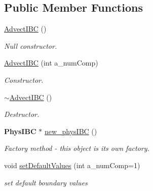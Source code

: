 \subsection*{Public Member Functions}
\begin{DoxyCompactItemize}
\item 
\mbox{\label{class_advect_i_b_c_af2d3f4fff7f08be3e1e3f140034bc34c}} 
\hyperlink{class_advect_i_b_c_af2d3f4fff7f08be3e1e3f140034bc34c}{Advect\+I\+BC} ()
\begin{DoxyCompactList}\small\item\em Null constructor. \end{DoxyCompactList}\item 
\mbox{\label{class_advect_i_b_c_a8897e6ad80cdff2121c4d4f6ce922ce1}} 
\hyperlink{class_advect_i_b_c_a8897e6ad80cdff2121c4d4f6ce922ce1}{Advect\+I\+BC} (int a\+\_\+num\+Comp)
\begin{DoxyCompactList}\small\item\em Constructor. \end{DoxyCompactList}\item 
\mbox{\label{class_advect_i_b_c_a4d1d956949384ad8621ba145de87952e}} 
\hyperlink{class_advect_i_b_c_a4d1d956949384ad8621ba145de87952e}{$\sim$\+Advect\+I\+BC} ()
\begin{DoxyCompactList}\small\item\em Destructor. \end{DoxyCompactList}\item 
\textbf{ Phys\+I\+BC} $\ast$ \hyperlink{class_advect_i_b_c_a4d092d4a393e169a87f7df920d09a2b0}{new\+\_\+phys\+I\+BC} ()
\begin{DoxyCompactList}\small\item\em Factory method -\/ this object is its own factory. \end{DoxyCompactList}\item 
\mbox{\label{class_advect_i_b_c_ae2edb5fa139b1655c3d7d87416da7023}} 
void \hyperlink{class_advect_i_b_c_ae2edb5fa139b1655c3d7d87416da7023}{set\+Default\+Values} (int a\+\_\+num\+Comp=1)
\begin{DoxyCompactList}\small\item\em set default boundary values \end{DoxyCompactList}\item 

\end{DoxyCompactItemize}
